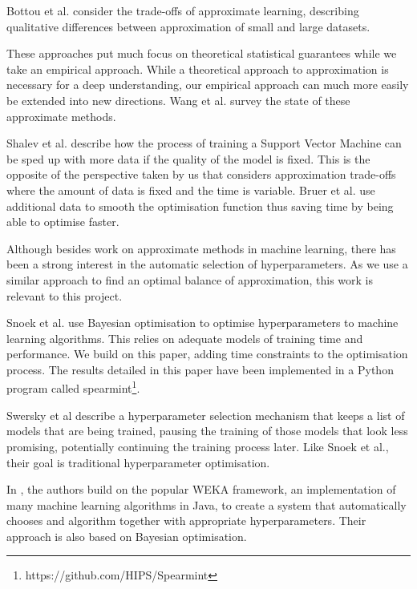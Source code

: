 \documentclass[a4paper,12pt,twoside,openright]{report}
\begin{document}
Bottou et al. \cite{Bottou08thetradeoffs} consider the trade-offs of approximate learning, describing qualitative differences between approximation of small and large datasets. 

These approaches put much focus on theoretical statistical guarantees while we take an empirical approach. While a theoretical approach to approximation is necessary for a deep understanding, our empirical approach can much more easily be extended into new directions. Wang et al. \cite{2015arXiv150207989W} survey the state of these approximate methods.

Shalev et al. \cite{Shalev-Shwartz:2008:SOI:1390156.1390273} describe how the process of training a Support Vector Machine can be sped up with more data if the quality of the model is fixed. This is the opposite of the perspective taken by us that considers approximation trade-offs where the amount of data is fixed and the time is variable. Bruer et al. \cite{NIPS2014_5259} use additional data to smooth the optimisation function thus saving time by being able to optimise faster.

Although besides work on approximate methods in machine learning, there has been a strong interest in the automatic selection of hyperparameters. As we use a similar approach to find an optimal balance of approximation, this work is relevant to this project.

Snoek et al. \cite{PracticalBayesianOptimization} use Bayesian optimisation to optimise hyperparameters to machine learning algorithms. This relies on adequate models of training time and performance. We build on this paper, adding time constraints to the optimisation process. The results detailed in this paper have been implemented in a Python program called spearmint\footnote{https://github.com/HIPS/Spearmint}.

Swersky et al \cite{2014arXiv1406.3896S} describe a hyperparameter selection mechanism that keeps a list of models that are being trained, pausing the training of those models that look less promising, potentially continuing the training process later. Like Snoek et al., their goal is traditional hyperparameter optimisation.

In \cite{ThoHutHooLey13-AutoWEKA}, the authors build on the popular WEKA framework, an implementation of many machine learning algorithms in Java, to create a system that automatically chooses and algorithm together with appropriate hyperparameters. Their approach is also based on Bayesian optimisation.
\end{document}
